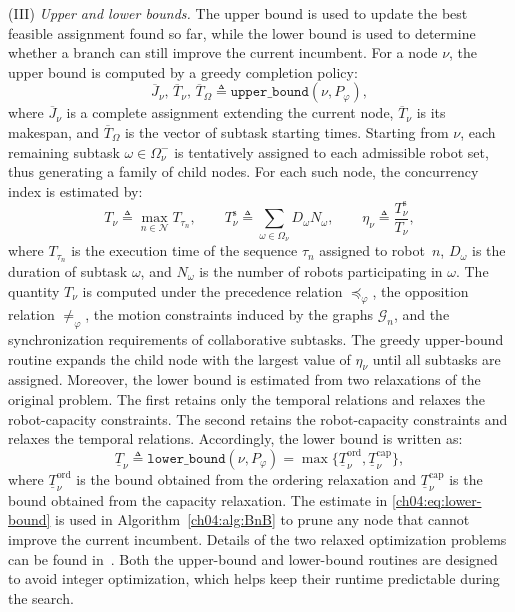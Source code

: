 (III) \emph{Upper and lower bounds.}
The upper bound is used to update the best feasible assignment found so far,
while the lower bound is used to determine whether a branch can still improve
the current incumbent. For a node $\nu$, the upper bound is computed by a greedy
completion policy:
\begin{equation}
\label{ch04:eq:upper-bound}
\overline{J}_{\nu},\,\overline{T}_{\nu},\,\overline{T}_{\Omega}
\triangleq
\texttt{upper\_bound}(\nu,P_{\varphi}),
\end{equation}
where $\overline{J}_{\nu}$ is a complete assignment extending the current node,
$\overline{T}_{\nu}$ is its makespan, and $\overline{T}_{\Omega}$ is the vector
of subtask starting times. Starting from $\nu$, each remaining subtask
$\omega\in\Omega_{\nu}^{-}$ is tentatively assigned to each admissible robot
set, thus generating a family of child nodes. For each such node, the
concurrency index is estimated by:
\begin{equation}
\label{ch04:eq:node-makespan}
T_{\nu}\triangleq\max_{n\in\mathcal{N}}T_{\tau_n}, \qquad
T_{\nu}^{\mathrm{s}}\triangleq
\sum_{\omega\in\Omega_{\nu}} D_{\omega}N_{\omega}, \qquad
\eta_{\nu}\triangleq \frac{T_{\nu}^{\mathrm{s}}}{T_{\nu}},
\end{equation}
where $T_{\tau_n}$ is the execution time of the sequence $\tau_n$ assigned to
robot~$n$, $D_{\omega}$ is the duration of subtask $\omega$, and
$N_{\omega}$ is the number of robots participating in $\omega$. The quantity
$T_{\nu}$ is computed under the precedence relation $\preceq_{\varphi}$, the
opposition relation $\neq_{\varphi}$, the motion constraints induced by the
graphs $\mathcal{G}_{n}$, and the synchronization requirements of
collaborative subtasks. 
The greedy upper-bound routine expands the child node
with the largest value of $\eta_{\nu}$ until all subtasks are assigned.
Moreover, the lower bound is estimated from two relaxations of the original problem.
The first retains only the temporal relations and relaxes the robot-capacity
constraints. The second retains the robot-capacity constraints and relaxes the
temporal relations. Accordingly, the lower bound is written as:
\begin{equation}
\label{ch04:eq:lower-bound}
\underline{T}_{\nu}\triangleq \texttt{lower\_bound}(\nu,P_{\varphi})
= \max\bigl\{\underline{T}_{\nu}^{\mathrm{ord}},
\underline{T}_{\nu}^{\mathrm{cap}}\bigr\},
\end{equation}
where $\underline{T}_{\nu}^{\mathrm{ord}}$ is the bound obtained from the
ordering relaxation and $\underline{T}_{\nu}^{\mathrm{cap}}$ is the bound
obtained from the capacity relaxation. The estimate in
\eqref{ch04:eq:lower-bound} is used in
Algorithm~\ref{ch04:alg:BnB} to prune any node that cannot improve the current
incumbent. Details of the two relaxed optimization problems can be found
in~\citet{liu2022arxiv}. Both the upper-bound and lower-bound routines are
designed to avoid integer optimization, which helps keep their runtime
predictable during the search.

